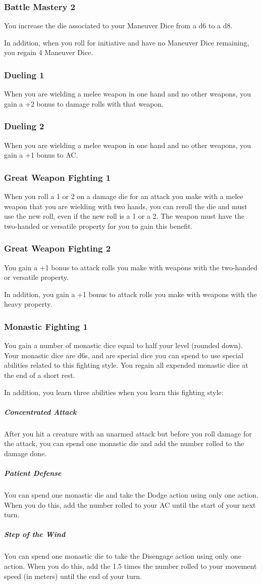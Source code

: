     \subsubsection{Battle Mastery 2}
        You increase the die associated to your Maneuver Dice from a d6 to a d8.

        In addition, when you roll for initiative and have no Maneuver Dice remaining, you regain 4 Maneuver Dice.
    \subsubsection{Dueling 1}
        When you are wielding a melee weapon in one hand and no other weapons, you gain a +2 bonus to damage rolls with that weapon.
    \subsubsection{Dueling 2}
        When you are wielding a melee weapon in one hand and no other weapons, you gain a +1 bonus to AC.
    \subsubsection{Great Weapon Fighting 1}
        When you roll a 1 or 2 on a damage die for an attack you make with a melee weapon that you are wielding with two hands, you can reroll the die and must use the new roll, even if the new roll is a 1 or a 2.
        The weapon must have the two-handed or versatile property for you to gain this benefit.
    \subsubsection{Great Weapon Fighting 2}
        You gain a +1 bonus to attack rolls you make with weapons with the two-handed or versatile property.

        In addition, you gain a +1 bonus to attack rolls you make with weapons with the heavy property.
    \subsubsection{Monastic Fighting 1}
        You gain a number of monastic dice equal to half your level (rounded down).
        Your monastic dice are d6s, and are special dice you can spend to use special abilities related to this fighting style.
        You regain all expended monastic dice at the end of a short rest.

        In addition, you learn three abilities when you learn this fighting style:
        \subparagraph{Concentrated Attack} After you hit a creature with an unarmed attack but before you roll damage for the attack, you can spend one monastic die and add the number rolled to the damage done.
        \subparagraph{Patient Defense} You can spend one monastic die and take the Dodge action using only one action.
        When you do this, add the number rolled to your AC until the start of your next turn.
        \subparagraph{Step of the Wind} You can spend one monastic die to take the Disengage action using only one action.
        When you do this, add the 1.5 times the number rolled to your movement speed (in meters) until the end of your turn.
